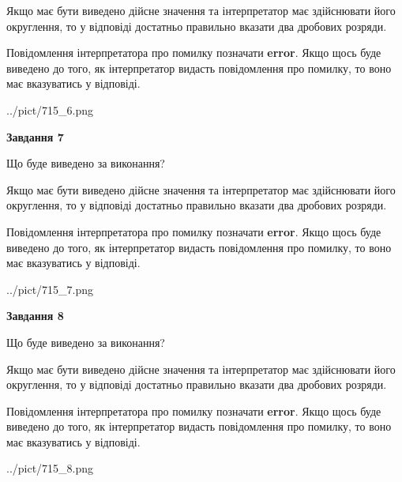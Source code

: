 \documentclass[12pt, ukrainian]{article}
\begin{document}
{\begin {Large}
Якщо має бути виведено дійсне значення та інтерпретатор має здійснювати його округлення, 
то у відповіді достатньо правильно вказати два дробових розряди.

Повідомлення інтерпретатора про помилку позначати \textbf{error}.
Якщо щось буде виведено до того, як інтерпретатор видасть повідомлення про помилку, 
то воно має вказуватись у відповіді. \par

\begin{center}
	{../pict/715_6.png}
\end{center}
\newpage

{\begin {center}\textbf{Завдання 7}\end {center}}\par
Що буде виведено за виконання? \par

Якщо має бути виведено дійсне значення та інтерпретатор має здійснювати його округлення, 
то у відповіді достатньо правильно вказати два дробових розряди.

Повідомлення інтерпретатора про помилку позначати \textbf{error}.
Якщо щось буде виведено до того, як інтерпретатор видасть повідомлення про помилку, 
то воно має вказуватись у відповіді. \par

\begin{center}
	{../pict/715_7.png}
\end{center}
\newpage

{\begin {center}\textbf{Завдання 8}\end {center}}\par
Що буде виведено за виконання? \par

Якщо має бути виведено дійсне значення та інтерпретатор має здійснювати його округлення, 
то у відповіді достатньо правильно вказати два дробових розряди.

Повідомлення інтерпретатора про помилку позначати \textbf{error}.
Якщо щось буде виведено до того, як інтерпретатор видасть повідомлення про помилку, 
то воно має вказуватись у відповіді. \par

\begin{center}
	{../pict/715_8.png}
\end{center}
\newpage


\end{Large}}
\end{document}
